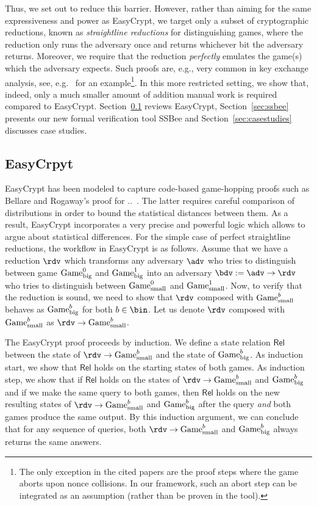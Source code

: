 Thus, we set out to reduce this barrier. However, rather than aiming for the same expressiveness and power as EasyCrypt, we target only a subset of cryptographic reductions, known as \emph{straightline reductions} for distinguishing games, where the reduction only runs the adversary once and returns whichever bit the adversary returns. Moreover, we require that the reduction \emph{perfectly} emulates the game(s) which the adversary expects. Such proofs are, e.g., very common in key exchange analysis, see, e.g.~\cite{X} for an example\footnote{The only exception in the cited papers are the proof steps where the game aborts upon nonce collisions. In our framework, such an abort step can be integrated as an assumption (rather than be proven in the tool).}. In this more restricted setting, we show that,
indeed, only a much smaller amount of addition manual work is required compared to EasyCrypt. Section~\ref{sec:easycrypt} reviews EasyCrypt, Section~\ref{sec:ssbee} presents our new formal verification tool SSBee and Section~\ref{sec:casestudies} discusses case studies.

\subsection{EasyCrpyt}\label{sec:easycrypt}
EasyCrypt has been modeled to capture code-based game-hopping proofs such as Bellare and Rogaway's proof for ..~\cite{EC:BelRog06}. The latter requires careful comparison of distributions in order to bound the statistical distances between them. As a result, EasyCrypt incorporates a very precise and powerful logic which allows to argue about statistical differences. For the simple case of perfect straightline reductions, the workflow in EasyCrypt is as follows. Assume that we have a reduction $\rdv$ which transforms any adversary $\adv$ who tries to distinguish between game $\text{\textrm{\upshape Game}}_\text{big}^0$ and $\text{\textrm{\upshape Game}}_\text{big}^1$ into an adversary $\bdv:=\adv\rightarrow\rdv$ who tries to distinguish between 
$\text{\textrm{\upshape Game}}_\text{small}^0$ and $\text{\textrm{\upshape Game}}_\text{small}^1$. Now, to verify that the reduction is sound, we  need to show that $\rdv$ composed with $\text{\textrm{\upshape Game}}_\text{small}^b$ behaves as $\text{\textrm{\upshape Game}}_\text{big}^b$ for both $b\in\bin$. Let us denote $\rdv$ composed with $\text{\textrm{\upshape Game}}_\text{small}^b$ as $\rdv\rightarrow\M{Game}_\text{small}^b$.

The EasyCrypt proof proceeds by induction. We define a state relation $\mathsf{Rel}$ between the state of 
$\rdv\rightarrow\M{Game}_\text{small}^b$ and the state of $\text{\textrm{\upshape Game}}_\text{big}^b$. As induction start, we show that $\mathsf{Rel}$ holds on the starting states of both games. As induction step, we show that if $\mathsf{Rel}$ holds on the states of $\rdv\rightarrow\M{Game}_\text{small}^b$ and $\text{\textrm{\upshape Game}}_\text{big}^b$ and if we make the same query to both games, then $\mathsf{Rel}$ holds on the new resulting states of
$\rdv\rightarrow\M{Game}_\text{small}^b$ and $\text{\textrm{\upshape Game}}_\text{big}^b$ after the query \emph{and} both games produce the same output. By this induction argument, we can conclude that for any sequence of queries, both $\rdv\rightarrow\M{Game}_\text{small}^b$ and $\text{\textrm{\upshape Game}}_\text{big}^b$ always returns the same answers.

